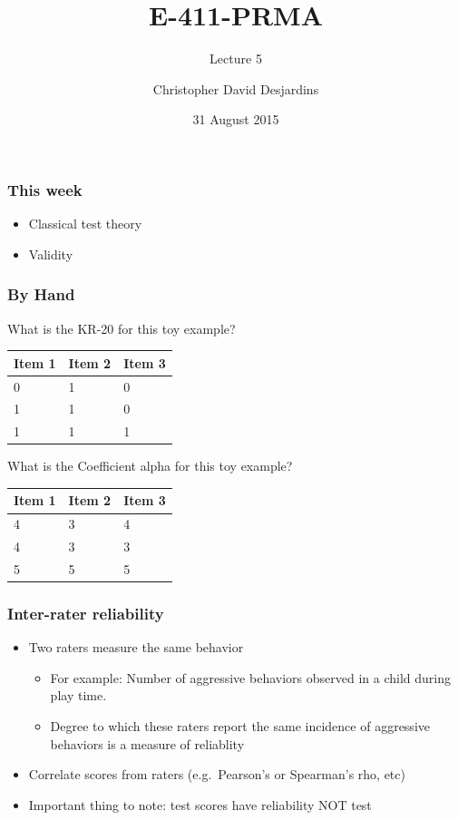 \documentclass[dvipsnames]{beamer}\usepackage[]{graphicx}\usepackage[]{color}
\title{E-411-PRMA}
\subtitle{Lecture 5}
\author{Christopher David Desjardins}
\date{31 August 2015}
\begin{document}
\frame{\titlepage}

\begin{frame}
\frametitle{This week}
\begin{itemize}
  \item Classical test theory
  \item Validity
\end{itemize}
\end{frame}

\begin{frame}
\frametitle{By Hand}
\begin{multicols}{2}
\footnotesize{
What is the KR-20 for this toy example?
\begin{tabular}{lll}
\hline
Item 1 & Item 2 & Item 3 \\ 
\hline
0 & 1  & 0 \\
1 & 1 & 0   \\
1 & 1 & 1 \\
\hline
\end{tabular}
}
\columnbreak

What is the Coefficient alpha for this toy example?

\footnotesize{
\begin{tabular}{lll}
\hline
Item 1 & Item 2  & Item 3 \\ 
\hline
4 & 3 & 4 \\
4 & 3 & 3\\
5 & 5 & 5 \\
\hline
\end{tabular}
}
\end{multicols}
\end{frame}

\begin{frame}
\frametitle{Inter-rater reliability}
\begin{itemize}
\item Two raters measure the same behavior
  \begin{itemize}
  \item For example: Number of aggressive behaviors observed in a child during play time.
  \item Degree to which these raters report the same incidence of aggressive behaviors is a measure of reliablity
  \end{itemize}
\item Correlate scores from raters (e.g.\ Pearson's or Spearman's rho, etc)
\item Important thing to note: test scores have reliability NOT test
\end{itemize}
\end{frame}
\end{document}
